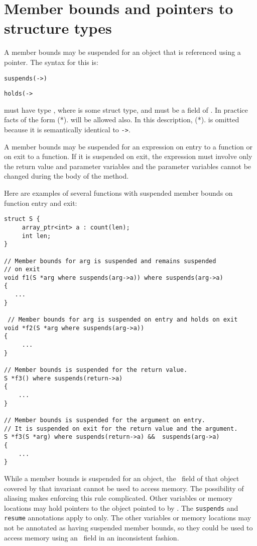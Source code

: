 
\chapter{Member bounds and pointers to structure types}
\label{chapter:aliased-members}

A member bounds may be suspended for an object that is referenced using
a pointer. The syntax for this is:


\texttt{suspends(}\texttt{-\textgreater{}}\texttt{)}

\texttt{holds(}\texttt{-\textgreater{}}

 must have type , where
 is some struct type, and  must be a field of
. In practice facts of the form (*).
will be allowed also. In this description,
(*). is omitted because it is semantically
identical to \texttt{-\textgreater{}}.

A member bounds may be suspended for an expression on entry to a
function or on exit to a function. If it is suspended on exit, the
expression must involve only the return value and parameter variables
and the parameter variables cannot be changed during the body of the
method.

Here are examples of several functions with suspended member bounds on
function entry and exit:

\begin{verbatim}
struct S {
     array_ptr<int> a : count(len);
     int len;
}

// Member bounds for arg is suspended and remains suspended
// on exit
void f1(S *arg where suspends(arg->a)) where suspends(arg->a)
{
   ...
}

 // Member bounds for arg is suspended on entry and holds on exit
void *f2(S *arg where suspends(arg->a))
{ 
     ...
}

// Member bounds is suspended for the return value.
S *f3() where suspends(return->a)
{
    ...
}

// Member bounds is suspended for the argument on entry.
// It is suspended on exit for the return value and the argument.
S *f3(S *arg) where suspends(return->a) &&  suspends(arg->a)
{
    ...
}
\end{verbatim}

While a member bounds is suspended for an object, the
\arrayptr\ field of that object covered by that invariant
cannot be used to access memory. The possibility of aliasing makes
enforcing this rule complicated. Other variables or memory locations may
hold pointers to the object pointed to by . The
\texttt{suspends} and \texttt{resume} annotations apply to 
only. The other variables or memory locations may not be annotated as
having suspended member bounds, so they could be used to access memory
using an \arrayptr\ field in an inconsistent fashion.

